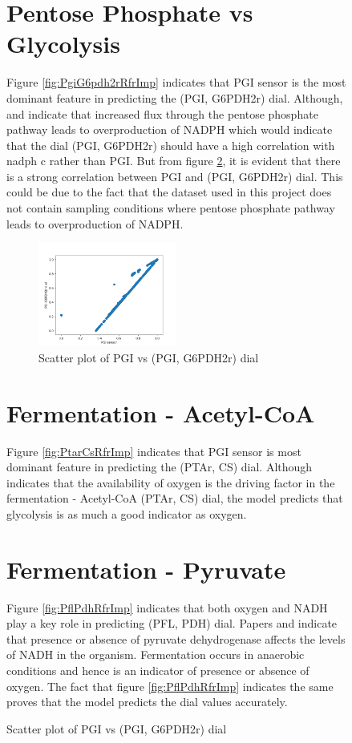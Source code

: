 \documentclass[12pt,chapterheads]{ucsd}
\begin{document}
\begin{figure}[h!]
\section{Pentose Phosphate vs Glycolysis}
Figure \ref{fig:PgiG6pdh2rRfrImp} indicates that PGI sensor is the most dominant feature in predicting the (PGI, G6PDH2r) dial. Although, \cite{pmid16899} and \cite{Fraenkel1967} indicate that increased flux through the pentose phosphate pathway leads to overproduction of NADPH which would indicate that the dial (PGI, G6PDH2r) should have a high correlation with nadph \textunderscore c rather than PGI. But from figure \ref{fig:PGIvsPGIG6PDH2rDial}, it is evident that there is a strong correlation between PGI and (PGI, G6PDH2r) dial. This could be due to the fact that the dataset used in this project does not contain sampling conditions where pentose phosphate pathway leads to overproduction of NADPH.
\begin{figure}[h] 
\centering
\includegraphics[width=0.5\textwidth]{PGI_PGI_G6PDH2r_new.png}
\caption[Scatter plot of PGI vs (PGI, G6PDH2r) dial]
{Scatter plot of PGI vs (PGI, G6PDH2r) dial}
\label{fig:PGIvsPGIG6PDH2rDial}
\end{figure}

\section{Fermentation - Acetyl-CoA}
Figure \ref{fig:PtarCsRfrImp} indicates that PGI sensor is most dominant feature in predicting the (PTAr, CS) dial. Although \cite{pmid9484901} indicates that the availability of oxygen is the driving factor in the fermentation - Acetyl-CoA (PTAr, CS) dial, the model predicts that glycolysis is as much a good indicator as oxygen. 

\section{Fermentation - Pyruvate}\label{sec:pflpdhImp}
Figure \ref{fig:PflPdhRfrImp} indicates that both oxygen and NADH play a key role in predicting (PFL, PDH) dial. Papers \cite{pmid2655695} and \cite{pmid22343352} indicate that presence or absence of pyruvate dehydrogenase affects the levels of NADH in the organism. Fermentation occurs in anaerobic conditions and hence is an indicator of presence or absence of oxygen. The fact that figure \ref{fig:PflPdhRfrImp} indicates the same proves that the model predicts the dial values accurately.

\end{figure}
\end{document}
